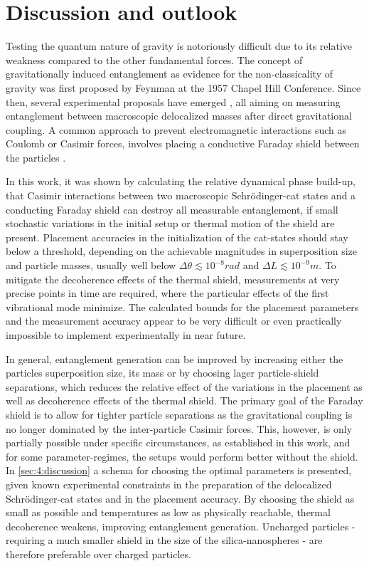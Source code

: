 \chapter{Discussion and outlook}\label{cha:discussion-outlook}
Testing the quantum nature of gravity is notoriously difficult due to its relative weakness compared to the other fundamental forces.
The concept of gravitationally induced entanglement as evidence for the non-classicality of gravity was first proposed by Feynman at the 1957 Chapel Hill Conference.
Since then, several experimental proposals have emerged \cite{Bose_2017,Marletto_2017, Krisnanda_2020}, all aiming on measuring entanglement between macroscopic delocalized masses after direct gravitational coupling.
A common approach to prevent electromagnetic interactions such as Coulomb or Casimir forces, involves placing a conductive Faraday shield between the particles \cite{Kamp_2020}.

In this work, it was shown by calculating the relative dynamical phase build-up, that Casimir interactions between two macroscopic Schrödinger-cat states and a conducting Faraday shield can destroy all measurable entanglement, if small stochastic variations in the initial setup or thermal motion of the shield are present.
Placement accuracies in the initialization of the cat-states should stay below a threshold, depending on the achievable magnitudes in superposition size and particle masses, usually well below $\Delta \theta \lesssim 10^{-8}\si{rad}$ and $\Delta L \lesssim 10^{-9}\si{m}$.
To mitigate the decoherence effects of the thermal shield, measurements at very precise points in time are required, where the particular effects of the first vibrational mode minimize.
The calculated bounds for the placement parameters and the measurement accuracy appear to be very difficult or even practically impossible to implement experimentally in near future.

In general, entanglement generation can be improved by increasing either the particles superposition size, its mass or by choosing lager particle-shield separations, which reduces the relative effect of the variations in the placement as well as decoherence effects of the thermal shield.
The primary goal of the Faraday shield is to allow for tighter particle separations as the gravitational coupling is no longer dominated by the inter-particle Casimir forces.
This, however, is only partially possible under specific circumstances, as established in this work, and for some parameter-regimes, the setups would perform better without the shield.
In \cref{sec:4:discussion} a schema for choosing the optimal parameters is presented, given known experimental constraints in the preparation of the delocalized Schrödinger-cat states and in the placement accuracy.
By choosing the shield as small as possible and temperatures as low as physically reachable, thermal decoherence weakens, improving entanglement generation.
Uncharged particles - requiring a much smaller shield in the size of the silica-nanospheres - are therefore preferable over charged particles.



